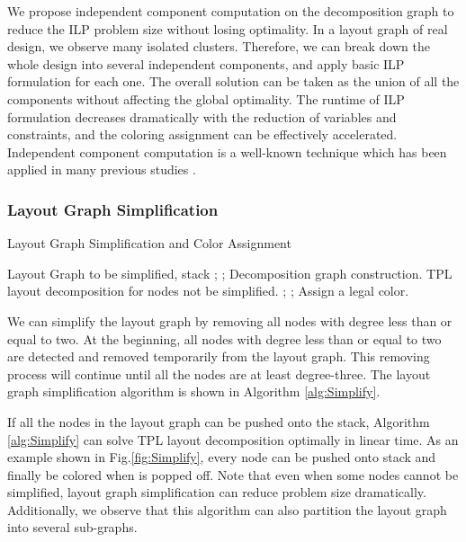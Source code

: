 \documentclass[10pt,conference]{IEEEtran}
\begin{document}
We propose independent component computation on the decomposition graph to reduce the ILP problem size without losing optimality.
In a layout graph of real design, we observe many isolated clusters.
Therefore, we can break down the whole design into several independent components, and apply basic ILP formulation for each one.
The overall solution can be taken as the union of all the components without affecting the global optimality.
The runtime of ILP formulation decreases dramatically with the reduction of variables and constraints, and the coloring assignment can be effectively accelerated.
Independent component computation is a well-known technique which has been applied in many previous studies \cite{DPL_ICCAD08_Kahng}\cite{DPL_ISPD09_Yuan}\cite{DPL_ASPDAC2010_Yang}\cite{DPL_ICCAD2010_Yuan}.


\subsubsection{Layout Graph Simplification}
\label{sec:Simplification}

\begin{algorithm}[htb]
\caption{Layout Graph Simplification and Color Assignment} 
\label{alg:Simplify}
\begin{algorithmic}[1]
   \REQUIRE Layout Graph  to be simplified, stack 
         \STATE ;
         \STATE ;
   \ENDWHILE
   \STATE Decomposition graph construction.
   \STATE TPL layout decomposition for nodes not be simplified.
   \WHILE{ }
   	\STATE ;
	\STATE ;
	\STATE Assign  a legal color.
   \ENDWHILE
\end{algorithmic}
\end{algorithm}


We can simplify the layout graph by removing all nodes with degree less than or equal to two.
At the beginning, all nodes with degree less than or equal to two are detected and removed temporarily from the layout graph.
This removing process will continue until all the nodes are at least degree-three.
The layout graph simplification algorithm is shown in Algorithm \ref{alg:Simplify}.


If all the nodes in the layout graph can be pushed onto the stack, Algorithm \ref{alg:Simplify} can solve TPL layout decomposition optimally in linear time. 
As an example shown in Fig.\ref{fig:Simplify}, every node can be pushed onto stack and finally be colored when is popped off.
Note that even when some nodes cannot be simplified, layout graph simplification can reduce problem size dramatically. 
Additionally, we observe that this algorithm can also partition the layout graph into several sub-graphs.
\end{document}
